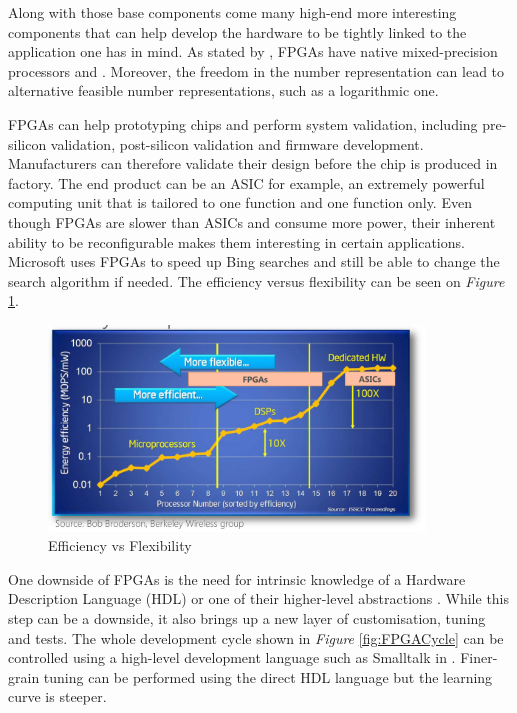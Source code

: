 Along with those base components come many high-end more interesting components that can help develop the hardware to be tightly linked to the application one has in mind. As stated by \cite{Goddeke2007}, FPGAs have native mixed-precision processors and . Moreover, the freedom in the number representation can lead to alternative feasible number representations, such as a logarithmic one.

FPGAs can help prototyping chips and perform system validation, including pre-silicon validation, post-silicon validation and firmware development. Manufacturers can therefore validate their design before the chip is produced in factory. The end product can be an ASIC for example, an extremely powerful computing unit that is tailored to one function and one function only. Even though FPGAs are slower than ASICs and consume more power, their inherent ability to be reconfigurable makes them interesting in certain applications. Microsoft uses FPGAs to speed up Bing searches and still be able to change the search algorithm if needed. The efficiency versus flexibility can be seen on \emph{Figure} \ref{fig:EfficiencyVSFlexibility}.

\begin{figure}[htbp]
	\centering
		\includegraphics[width=10cm]{Figures/EfficiencyVSFlexibility.png}
	\caption[EfficiencyVSFlexibility]{Efficiency vs Flexibility}
	\label{fig:EfficiencyVSFlexibility}
\end{figure}

One downside of FPGAs is the need for intrinsic knowledge of a Hardware Description Language (HDL) or one of their higher-level abstractions \cite{XuanSang2014}. While this step can be a downside, it also brings up a new layer of customisation, tuning and tests. The whole development cycle shown in \emph{Figure} \ref{fig:FPGACycle} can be controlled using a high-level development language such as Smalltalk in \cite{XuanSang2014}. Finer-grain tuning can be performed using the direct HDL language but the learning curve is steeper.

